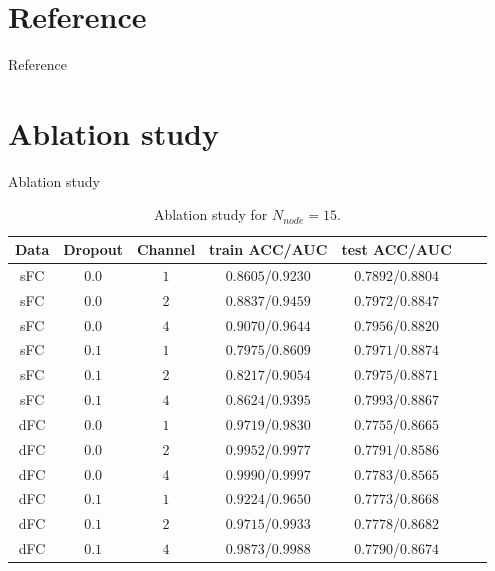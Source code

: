 \documentclass{beamer}
\begin{document}
\section*{Reference}
\begin{frame}[allowframebreaks]{Reference}
    \printbibliography
\end{frame}

\appendix

\section{Ablation study}
\begin{frame}{Ablation study}

    \begin{table}[H]
        \centering
        \begin{tabular}{|c|c|c|c|c|c|c|}
            \hline
            Data & Dropout & Channel & train ACC/AUC     & test ACC/AUC      \\
            \hline
            sFC  & $0.0$   & $1$     & $0.8605$/$0.9230$ & $0.7892$/$0.8804$ \\
            \hline
            sFC  & $0.0$   & $2$     & $0.8837$/$0.9459$ & $0.7972$/$0.8847$ \\
            \hline
            sFC  & $0.0$   & $4$     & $0.9070$/$0.9644$ & $0.7956$/$0.8820$ \\
            \hline
            sFC  & $0.1$   & $1$     & $0.7975$/$0.8609$ & $0.7971$/$0.8874$ \\
            \hline
            sFC  & $0.1$   & $2$     & $0.8217$/$0.9054$ & $0.7975$/$0.8871$ \\
            \hline
            sFC  & $0.1$   & $4$     & $0.8624$/$0.9395$ & $0.7993$/$0.8867$ \\
            \hline
            dFC  & $0.0$   & $1$     & $0.9719$/$0.9830$ & $0.7755$/$0.8665$ \\
            \hline
            dFC  & $0.0$   & $2$     & $0.9952$/$0.9977$ & $0.7791$/$0.8586$ \\
            \hline
            dFC  & $0.0$   & $4$     & $0.9990$/$0.9997$ & $0.7783$/$0.8565$ \\
            \hline
            dFC  & $0.1$   & $1$     & $0.9224$/$0.9650$ & $0.7773$/$0.8668$ \\
            \hline
            dFC  & $0.1$   & $2$     & $0.9715$/$0.9933$ & $0.7778$/$0.8682$ \\
            \hline
            dFC  & $0.1$   & $4$     & $0.9873$/$0.9988$ & $0.7790$/$0.8674$ \\
            \hline
        \end{tabular}
        \caption{Ablation study for $N_{node} = 15$.}
    \end{table}

\end{frame}
\end{document}
